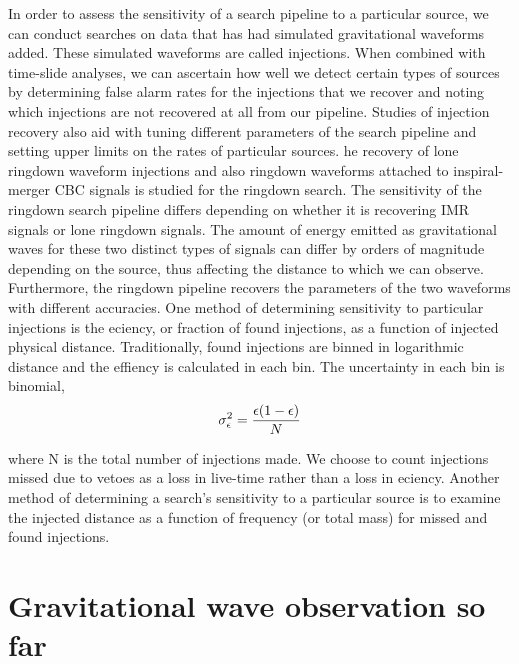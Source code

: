 \documentclass[binding=0.6cm, LaM]{sapthesis}
\begin{document}
In order to assess the sensitivity of a search pipeline to a particular source, 
	we can conduct searches on data that has had simulated gravitational waveforms added.
	 These simulated waveforms are called injections. 
	When combined with time-slide analyses, 
	we can ascertain how well we detect certain types of sources 
	by determining false alarm rates for the injections that we recover 
	and noting which injections are not recovered at all from our pipeline. 
	Studies of injection recovery also aid with tuning different parameters 
	of the search pipeline and setting upper limits on the rates of particular sources. 
	he recovery of lone ringdown waveform injections and also ringdown waveforms 
	attached to inspiral-merger CBC signals is studied for the ringdown search. 
	The sensitivity of the ringdown search pipeline differs depending on whether 
	it is recovering IMR signals or lone ringdown signals. 
	The amount of energy emitted as gravitational waves 
	for these two distinct types of signals can differ by orders of magnitude 
	depending on the source, thus affecting the distance to which we can observe. 
	Furthermore, the ringdown pipeline recovers the parameters 
	of the two waveforms with different accuracies. 
	One method of determining sensitivity to particular injections is the eciency, 
	or fraction of found injections, as a function of injected physical distance. 
	Traditionally, found injections are binned in logarithmic distance 
	and the effiency is calculated in each bin. 
	The uncertainty in each bin is binomial, 
		\begin{equation}
			\sigma^2_{\epsilon} = {{\epsilon(1-\epsilon)} \over {N}}
		\end{equation}

	where N is the total number of injections made. 
	We choose to count injections missed due to vetoes as 
	a loss in live-time rather than a loss in eciency. 
	 Another method of determining a search’s sensitivity to a particular source 
	is to examine the injected distance as a function of frequency 
	(or total mass) for missed and found injections. 
	

\chapter{Gravitational wave observation so far}
\end{document}
